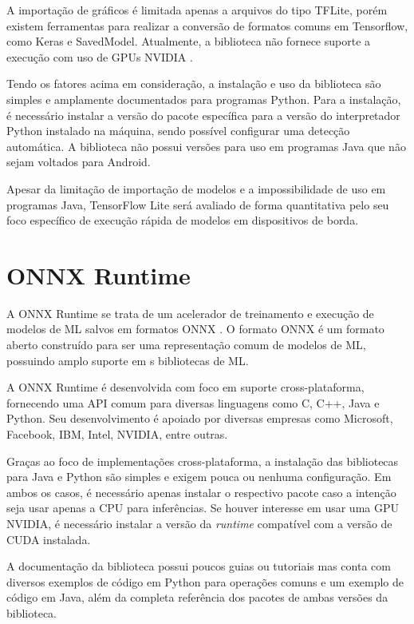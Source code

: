 A importação de gráficos é limitada apenas a arquivos do tipo TFLite, porém existem ferramentas para realizar a conversão de formatos comuns em Tensorflow, como Keras e SavedModel. Atualmente, a biblioteca não fornece suporte a execução com uso de GPUs NVIDIA \cite{ml_site_tensorflow_lite_gpus}.

Tendo os fatores acima em consideração, a instalação e uso da biblioteca são simples e amplamente documentados para programas Python. Para a instalação, é necessário instalar a versão do pacote específica para a versão do interpretador Python instalado na máquina, sendo possível configurar uma detecção automática. A biblioteca não possui versões para uso em programas Java que não sejam voltados para Android.

Apesar da limitação de importação de modelos e a impossibilidade de uso em programas Java, TensorFlow Lite será avaliado de forma quantitativa pelo seu foco específico de execução rápida de modelos em dispositivos de borda.

\section{ONNX Runtime}

A ONNX Runtime \cite{ml_site_onnx_runtime} se trata de um acelerador de treinamento e execução de modelos de ML salvos em formatos ONNX \cite{ml_site_onnx}. O formato ONNX é um formato aberto construído para ser uma representação comum de modelos de ML, possuindo amplo suporte em s bibliotecas de ML.

A ONNX Runtime é desenvolvida com foco em suporte cross-plataforma, fornecendo uma API comum para diversas linguagens como C, C++, Java e Python. Seu desenvolvimento é apoiado por diversas empresas como Microsoft, Facebook, IBM, Intel, NVIDIA, entre outras.

Graças ao foco de implementações cross-plataforma, a instalação das bibliotecas para Java e Python são simples e exigem pouca ou nenhuma configuração. Em ambos os casos, é necessário apenas instalar o respectivo pacote caso a intenção seja usar apenas a CPU para inferências. Se houver interesse em usar uma GPU NVIDIA, é necessário instalar a versão da \textit{runtime} compatível com a versão de CUDA instalada.

A documentação da biblioteca possui poucos guias ou tutoriais mas conta com diversos exemplos de código em Python para operações comuns e um exemplo de código em Java, além da completa referência dos pacotes de ambas versões da biblioteca.

